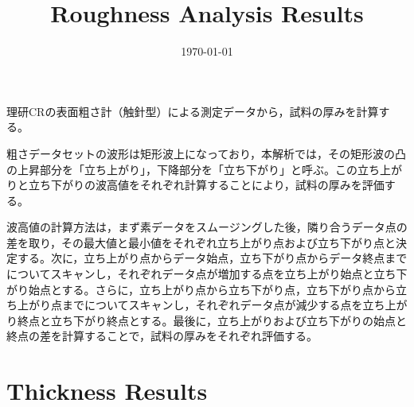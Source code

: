 \documentclass[platex,dvipdfmx,10pt,twoside,a4paper,jis2004]{jsarticle}
\title{Roughness Analysis Results}
\author{}
\date{\today}
\begin{document}
\maketitle
理研CRの表面粗さ計（触針型）による測定データから，試料の厚みを計算する。
\par
粗さデータセットの波形は矩形波上になっており，本解析では，その矩形波の凸の上昇部分を「立ち上がり」，下降部分を「立ち下がり」と呼ぶ。この立ち上がりと立ち下がりの波高値をそれぞれ計算することにより，試料の厚みを評価する。
\par
波高値の計算方法は，まず素データをスムージングした後，隣り合うデータ点の差を取り，その最大値と最小値をそれぞれ立ち上がり点および立ち下がり点と決定する。次に，立ち上がり点からデータ始点，立ち下がり点からデータ終点までについてスキャンし，それぞれデータ点が増加する点を立ち上がり始点と立ち下がり始点とする。さらに，立ち上がり点から立ち下がり点，立ち下がり点から立ち上がり点までについてスキャンし，それぞれデータ点が減少する点を立ち上がり終点と立ち下がり終点とする。最後に，立ち上がりおよび立ち下がりの始点と終点の差を計算することで，試料の厚みをそれぞれ評価する。
\clearpage

\section*{Thickness Results}
\end{document}
